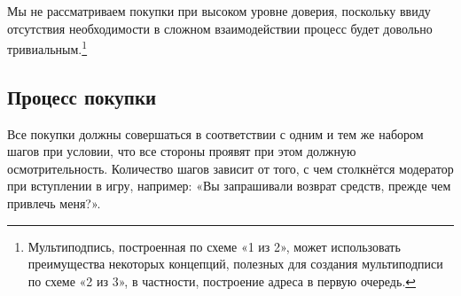 Мы не рассматриваем покупки при высоком уровне доверия, поскольку ввиду отсутствия необходимости в сложном взаимодействии процесс будет довольно тривиальным.\footnote{Мультиподпись, построенная по схеме «1 из 2», может использовать преимущества некоторых концепций, полезных для создания мультиподписи по схеме «2 из 3», в частности, построение адреса в первую очередь.}


\subsection{Процесс покупки}
\label{subsec:escrowed-marketplace-purchasing-workflow}

Все покупки должны совершаться в соответствии с одним и тем же набором шагов при условии, что все стороны проявят при этом должную осмотрительность. Количество шагов зависит от того, с чем столкнётся модератор при вступлении в игру, например: «Вы запраши\-вали возврат средств, прежде чем привлечь меня?».
